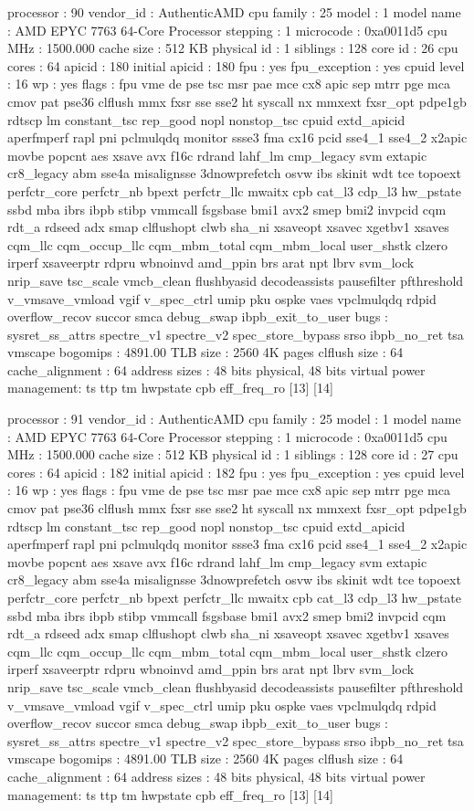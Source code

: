 processor	: 90
vendor_id	: AuthenticAMD
cpu family	: 25
model		: 1
model name	: AMD EPYC 7763 64-Core Processor
stepping	: 1
microcode	: 0xa0011d5
cpu MHz		: 1500.000
cache size	: 512 KB
physical id	: 1
siblings	: 128
core id		: 26
cpu cores	: 64
apicid		: 180
initial apicid	: 180
fpu		: yes
fpu_exception	: yes
cpuid level	: 16
wp		: yes
flags		: fpu vme de pse tsc msr pae mce cx8 apic sep mtrr pge mca cmov pat pse36 clflush mmx fxsr sse sse2 ht syscall nx mmxext fxsr_opt pdpe1gb rdtscp lm constant_tsc rep_good nopl nonstop_tsc cpuid extd_apicid aperfmperf rapl pni pclmulqdq monitor ssse3 fma cx16 pcid sse4_1 sse4_2 x2apic movbe popcnt aes xsave avx f16c rdrand lahf_lm cmp_legacy svm extapic cr8_legacy abm sse4a misalignsse 3dnowprefetch osvw ibs skinit wdt tce topoext perfctr_core perfctr_nb bpext perfctr_llc mwaitx cpb cat_l3 cdp_l3 hw_pstate ssbd mba ibrs ibpb stibp vmmcall fsgsbase bmi1 avx2 smep bmi2 invpcid cqm rdt_a rdseed adx smap clflushopt clwb sha_ni xsaveopt xsavec xgetbv1 xsaves cqm_llc cqm_occup_llc cqm_mbm_total cqm_mbm_local user_shstk clzero irperf xsaveerptr rdpru wbnoinvd amd_ppin brs arat npt lbrv svm_lock nrip_save tsc_scale vmcb_clean flushbyasid decodeassists pausefilter pfthreshold v_vmsave_vmload vgif v_spec_ctrl umip pku ospke vaes vpclmulqdq rdpid overflow_recov succor smca debug_swap ibpb_exit_to_user
bugs		: sysret_ss_attrs spectre_v1 spectre_v2 spec_store_bypass srso ibpb_no_ret tsa vmscape
bogomips	: 4891.00
TLB size	: 2560 4K pages
clflush size	: 64
cache_alignment	: 64
address sizes	: 48 bits physical, 48 bits virtual
power management: ts ttp tm hwpstate cpb eff_freq_ro [13] [14]

processor	: 91
vendor_id	: AuthenticAMD
cpu family	: 25
model		: 1
model name	: AMD EPYC 7763 64-Core Processor
stepping	: 1
microcode	: 0xa0011d5
cpu MHz		: 1500.000
cache size	: 512 KB
physical id	: 1
siblings	: 128
core id		: 27
cpu cores	: 64
apicid		: 182
initial apicid	: 182
fpu		: yes
fpu_exception	: yes
cpuid level	: 16
wp		: yes
flags		: fpu vme de pse tsc msr pae mce cx8 apic sep mtrr pge mca cmov pat pse36 clflush mmx fxsr sse sse2 ht syscall nx mmxext fxsr_opt pdpe1gb rdtscp lm constant_tsc rep_good nopl nonstop_tsc cpuid extd_apicid aperfmperf rapl pni pclmulqdq monitor ssse3 fma cx16 pcid sse4_1 sse4_2 x2apic movbe popcnt aes xsave avx f16c rdrand lahf_lm cmp_legacy svm extapic cr8_legacy abm sse4a misalignsse 3dnowprefetch osvw ibs skinit wdt tce topoext perfctr_core perfctr_nb bpext perfctr_llc mwaitx cpb cat_l3 cdp_l3 hw_pstate ssbd mba ibrs ibpb stibp vmmcall fsgsbase bmi1 avx2 smep bmi2 invpcid cqm rdt_a rdseed adx smap clflushopt clwb sha_ni xsaveopt xsavec xgetbv1 xsaves cqm_llc cqm_occup_llc cqm_mbm_total cqm_mbm_local user_shstk clzero irperf xsaveerptr rdpru wbnoinvd amd_ppin brs arat npt lbrv svm_lock nrip_save tsc_scale vmcb_clean flushbyasid decodeassists pausefilter pfthreshold v_vmsave_vmload vgif v_spec_ctrl umip pku ospke vaes vpclmulqdq rdpid overflow_recov succor smca debug_swap ibpb_exit_to_user
bugs		: sysret_ss_attrs spectre_v1 spectre_v2 spec_store_bypass srso ibpb_no_ret tsa vmscape
bogomips	: 4891.00
TLB size	: 2560 4K pages
clflush size	: 64
cache_alignment	: 64
address sizes	: 48 bits physical, 48 bits virtual
power management: ts ttp tm hwpstate cpb eff_freq_ro [13] [14]

